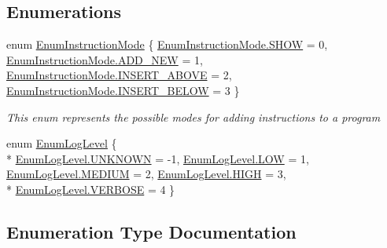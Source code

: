 \subsection*{Enumerations}
\begin{DoxyCompactItemize}
\item 
enum \hyperlink{namespace_c_p_u___o_s___simulator_adc17a5a5e004084f05dc8e4d3f70e31f}{Enum\+Instruction\+Mode} \{ \hyperlink{namespace_c_p_u___o_s___simulator_adc17a5a5e004084f05dc8e4d3f70e31fac34fbad9a5e2a1d0c8f7cf8d226808b9}{Enum\+Instruction\+Mode.\+S\+H\+O\+W} = 0, 
\hyperlink{namespace_c_p_u___o_s___simulator_adc17a5a5e004084f05dc8e4d3f70e31faee3564492739daa789b12c0b8a2e6a25}{Enum\+Instruction\+Mode.\+A\+D\+D\+\_\+\+N\+E\+W} = 1, 
\hyperlink{namespace_c_p_u___o_s___simulator_adc17a5a5e004084f05dc8e4d3f70e31fa956b44f941eb5917f3cfcf0ba56db19b}{Enum\+Instruction\+Mode.\+I\+N\+S\+E\+R\+T\+\_\+\+A\+B\+O\+V\+E} = 2, 
\hyperlink{namespace_c_p_u___o_s___simulator_adc17a5a5e004084f05dc8e4d3f70e31fa0310160f3dc4ecec481c20ca1cf88be3}{Enum\+Instruction\+Mode.\+I\+N\+S\+E\+R\+T\+\_\+\+B\+E\+L\+O\+W} = 3
 \}\begin{DoxyCompactList}\small\item\em This enum represents the possible modes for adding instructions to a program \end{DoxyCompactList}
\item 
enum \hyperlink{namespace_c_p_u___o_s___simulator_ad76442226f076d91d8f4523d7ee3db0f}{Enum\+Log\+Level} \{ \\*
\hyperlink{namespace_c_p_u___o_s___simulator_ad76442226f076d91d8f4523d7ee3db0fa696b031073e74bf2cb98e5ef201d4aa3}{Enum\+Log\+Level.\+U\+N\+K\+N\+O\+W\+N} = -\/1, 
\hyperlink{namespace_c_p_u___o_s___simulator_ad76442226f076d91d8f4523d7ee3db0fa41bc94cbd8eebea13ce0491b2ac11b88}{Enum\+Log\+Level.\+L\+O\+W} = 1, 
\hyperlink{namespace_c_p_u___o_s___simulator_ad76442226f076d91d8f4523d7ee3db0fac87f3be66ffc3c0d4249f1c2cc5f3cce}{Enum\+Log\+Level.\+M\+E\+D\+I\+U\+M} = 2, 
\hyperlink{namespace_c_p_u___o_s___simulator_ad76442226f076d91d8f4523d7ee3db0fab89de3b4b81c4facfac906edf29aec8c}{Enum\+Log\+Level.\+H\+I\+G\+H} = 3, 
\\*
\hyperlink{namespace_c_p_u___o_s___simulator_ad76442226f076d91d8f4523d7ee3db0faec1f06e9fb39c4ef0729b3c7c9c8e8cc}{Enum\+Log\+Level.\+V\+E\+R\+B\+O\+S\+E} = 4
 \}
\end{DoxyCompactItemize}


\subsection{Enumeration Type Documentation}
\hypertarget{namespace_c_p_u___o_s___simulator_adc17a5a5e004084f05dc8e4d3f70e31f}{}
